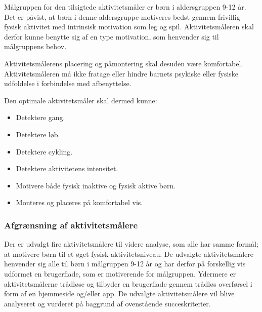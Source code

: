Målgruppen for den tilsigtede aktivitetsmåler er børn i aldersgruppen 9-12 år. Det er påvist, at børn i denne aldersgruppe motiveres bedst gennem frivillig fysisk aktivitet med intrinsisk motivation som leg og spil. Aktivitetsmåleren skal derfor kunne benytte sig af en type motivation, som henvender sig til målgruppens behov.

Aktivitetsmålerens placering og påmontering skal desuden være komfortabel. Aktivitetsmåleren må ikke fratage eller hindre barnets psykiske eller fysiske udfoldelse i forbindelse med afbenyttelse. 

Den optimale aktivitetsmåler skal dermed kunne: 
\begin{itemize}
\item Detektere gang.
\item Detektere løb.
\item Detektere cykling. %
\item Detektere aktivitetens intensitet. %
\item Motivere både fysisk inaktive og fysisk aktive børn. %
\item Monteres og placeres på komfortabel vis.
\end{itemize}

\subsubsection{Afgrænsning af aktivitetsmålere}  %
Der er udvalgt fire aktivitetsmålere til videre analyse, som alle har samme formål; at motivere børn til et øget fysisk aktivitetsniveau. De udvalgte aktivitetsmålere henvender sig alle til børn i målgruppen 9-12 år og har derfor på forskellig vis udformet en brugerflade, som er motiverende for målgruppen. Ydermere er aktivitetsmålerne trådløse og tilbyder en brugerflade gennem trådløs overførsel i form af en hjemmeside og/eller app. \newline
De udvalgte aktivitetsmålere vil blive analyseret og vurderet på baggrund af ovenstående succeskriterier.

